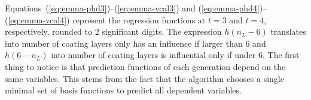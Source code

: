 Equations~(\ref{eq:emma-phd3})--(\ref{eq:emma-vcal3}) and (\ref{eq:emma-phd4})--(\ref{eq:emma-vcal4}) represent the regression functions at $t=3$ and $t=4$, respectively, rounded to 2 significant digits.
The expression $h(n_L-6)$ translates into number of coating layers only has an influence if larger than 6 
and $h(6-n_L)$ into number of coating layers is influential only if under 6.
%
The first thing to notice is that prediction functions of each generation depend on the same variables. 
This stems from the fact that the algorithm chooses a single minimal set of basis functions to predict all dependent variables. 
%

